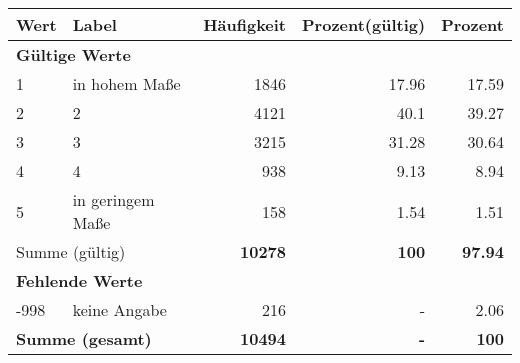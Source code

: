      \begin{longtable}{lXrrr}
     \toprule
     \textbf{Wert} & \textbf{Label} & \textbf{Häufigkeit} & \textbf{Prozent(gültig)} & \textbf{Prozent} \\
     \endhead
     \midrule
     \multicolumn{5}{l}{\textbf{Gültige Werte}}\\

     1 &
     \multicolumn{1}{X}{ in hohem Maße   } &


       \num{1846} &
       \num[round-mode=places,round-precision=2]{17,96} &
         \num[round-mode=places,round-precision=2]{17,59} \\

     2 &
     \multicolumn{1}{X}{ 2   } &


       \num{4121} &
       \num[round-mode=places,round-precision=2]{40,1} &
         \num[round-mode=places,round-precision=2]{39,27} \\

     3 &
     \multicolumn{1}{X}{ 3   } &


       \num{3215} &
       \num[round-mode=places,round-precision=2]{31,28} &
         \num[round-mode=places,round-precision=2]{30,64} \\

     4 &
     \multicolumn{1}{X}{ 4   } &


       \num{938} &
       \num[round-mode=places,round-precision=2]{9,13} &
         \num[round-mode=places,round-precision=2]{8,94} \\

     5 &
     \multicolumn{1}{X}{ in geringem Maße   } &


       \num{158} &
       \num[round-mode=places,round-precision=2]{1,54} &
         \num[round-mode=places,round-precision=2]{1,51} \\
     \midrule
     \multicolumn{2}{l}{Summe (gültig)} &
       \textbf{\num{10278}} &
     \textbf{100} &
       \textbf{\num[round-mode=places,round-precision=2]{97,94}} \\
     \multicolumn{5}{l}{\textbf{Fehlende Werte}}\\
       -998 &
       keine Angabe &
         \num{216} &
        - &
         \num[round-mode=places,round-precision=2]{2,06} \\
     \midrule
     \multicolumn{2}{l}{\textbf{Summe (gesamt)}} &
          \textbf{\num{10494}} &
        \textbf{-} &
        \textbf{100} \\
     \bottomrule
     \end{longtable}
     
